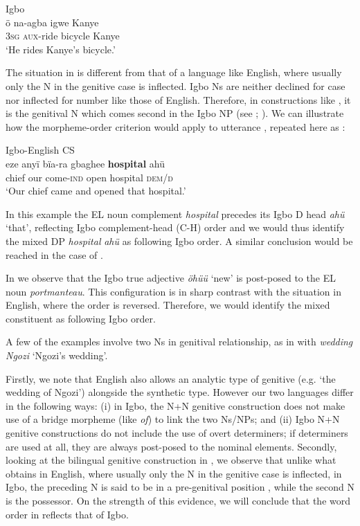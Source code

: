 \documentclass[output=paper]{langsci/langscibook}
\begin{document}
\ea\label{ex:ihemere:10}
{Igbo}\\
\gll ö    na-agba   igwe    Kanye\\
     \textsc{3sg}    \textsc{aux}-ride  bicycle    Kanye\\
\glt ‘He rides Kanye’s bicycle.’
\z

The situation in  is different from that of a language like English, where usually only the N in the genitive case is inflected. Igbo Ns are neither declined for case nor inflected for number like those of English. Therefore, in constructions like , it is the genitival N which comes second in the Igbo NP (see \citealt{Emenanjo1978}; \citealt{Uwalaka1997}). We can illustrate how the morpheme-order criterion would apply to utterance , repeated here as :

\ea\label{ex:ihemere:11}
{Igbo-English CS}\\
\gll eze    anyï  bïa-ra        gbaghee  \textbf{hospital}  ahü  \\
     chief   our  come-\textsc{ind}  open        hospital    \textsc{dem/d}\\
\glt ‘Our chief came and opened that hospital.’
\z

In this example the EL noun complement \textit{hospital} precedes its Igbo D head \textit{ahü} ‘that’, reflecting Igbo complement-head (C-H) order and we would thus identify the mixed DP \textit{hospital}\textbf{\textit{}} \textit{ahü} as following Igbo order. A similar conclusion would be reached in the case of .

In  we observe that the Igbo true adjective \textit{öhüü} ‘new’ is post-posed to the EL noun \textit{portmanteau}. This configuration is in sharp contrast with the situation in English, where the order is reversed. Therefore, we would identify the mixed constituent as following Igbo order. 

A few of the examples involve two Ns in genitival relationship, as in  with \textit{wedding Ngozi} ‘Ngozi’s wedding’. 

Firstly, we note that English also allows an analytic type of genitive (e.g. ‘the wedding of Ngozi’) alongside the synthetic type. However our two languages differ in the following ways: (i) in Igbo, the N+N genitive construction does not make use of a bridge morpheme (like \textit{of}) to link the two Ns/NPs; and (ii) Igbo N+N genitive constructions do not include the use of overt determiners; if determiners are used at all, they are always post-posed to the nominal elements. Secondly, looking at the bilingual genitive construction in , we observe that unlike what obtains in English, where usually only the N in the genitive case is inflected, in Igbo, the preceding N is said to be in a pre-genitival position \citep{Uwalaka1997}, while the second N is the possessor. On the strength of this evidence, we will conclude that the word order in  reflects that of Igbo. 
\end{document}
